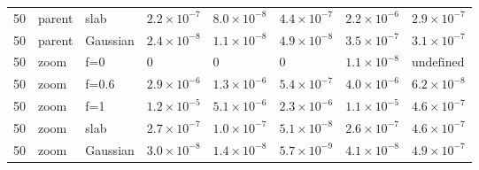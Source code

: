 \begin{table}[htbp]
\begin{tabular}{llllllll}
50 & parent & slab & $2.2\times10^{-7}$ & $8.0\times10^{-8}$ & $4.4\times10^{-7}$ & $2.2\times10^{-6}$ & $2.9\times10^{-7}$\\
50 & parent & Gaussian & $2.4\times10^{-8}$ & $1.1\times10^{-8}$ & $4.9\times10^{-8}$ & $3.5\times10^{-7}$ & $3.1\times10^{-7}$\\
50 & zoom & f=0 & $0$ & $0$ & $0$ & $1.1\times10^{-8}$ & $\text{undefined}$\\
50 & zoom & f=0.6 & $2.9\times10^{-6}$ & $1.3\times10^{-6}$ & $5.4\times10^{-7}$ & $4.0\times10^{-6}$ & $6.2\times10^{-8}$\\
50 & zoom & f=1 & $1.2\times10^{-5}$ & $5.1\times10^{-6}$ & $2.3\times10^{-6}$ & $1.1\times10^{-5}$ & $4.6\times10^{-7}$\\
50 & zoom & slab & $2.7\times10^{-7}$ & $1.0\times10^{-7}$ & $5.1\times10^{-8}$ & $2.6\times10^{-7}$ & $4.6\times10^{-7}$\\
50 & zoom & Gaussian & $3.0\times10^{-8}$ & $1.4\times10^{-8}$ & $5.7\times10^{-9}$ & $4.1\times10^{-8}$ & $4.9\times10^{-7}$\\
\bottomrule
\end{tabular}
\end{table}
